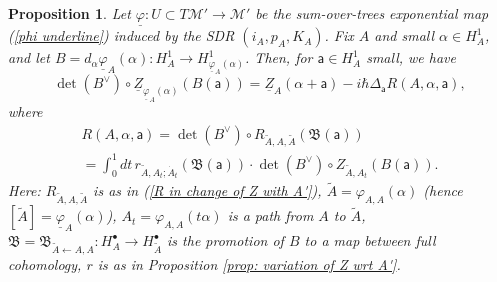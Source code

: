 \documentclass[11pt,a4paper]{amsart}
\theoremstyle{plain} %
\newtheorem{prop}[thm]{Proposition}
\theoremstyle{definition}
\theoremstyle{remark}
\newcommand{\sfa}{\mathsf{a}}
\newcommand{\sfb}{\mathsf{b}}
\newcommand{\bt}{\bullet}
\newcommand{\ra}{\rightarrow}
\newcommand{\M}{\mathcal{M}}
\newcommand{\til}{\widetilde}
\newcommand{\la}{\leftarrow}
\newcommand{\ul}{\underline}
\begin{document}
\begin{prop}\label{prop ulZ finite horizontality}
    Let $\underline\varphi \colon U \subset T\M'\to \M'$ be the sum-over-trees exponential map (\ref{phi underline}) induced by the SDR $(i_{A},p_{A},K_{A})$. Fix $A$ and small $\alpha\in H^1_{A}$, %
    and let $B=d_\alpha\ul\varphi_{A}(\alpha)\colon H^1_{A}\ra H^1_{\ul\varphi_A(\alpha)}$. Then, for $\sfa\in H^1_{A}$ small, we have
    \begin{equation}\label{Z underline finite almost-Grothendieck-horizontality}
        \det(B^\vee)\circ \underline{Z}_{\underline{\varphi}_{A}(\alpha)} (B(\sfa))=\underline{Z}_{A}(\alpha + \sfa)  -i\hbar \Delta_\sfa R(A,\alpha,\sfa) ,
    \end{equation}
    where 
    \begin{multline}\label{R for Z underline finite almost-Grothendieck-horizontality}
        R(A,\alpha,\sfa)=\det (B^\vee)\circ R_{\til{A},A,\til{A}}(\mathfrak{B}(\sfa))\\
        = \int_0^1 dt\, r_{\til{A},A_t;\dot{A}_t}(\mathfrak{B}(\sfa))\cdot \det(B^\vee)\circ Z_{\til{A},A_t}(B(\sfa)).
    \end{multline}
    Here: $R_{\til{A},A,\til{A}}$ %
    is as in (\ref{R in change of Z with A'}),
    $\til{A}=\varphi_{A,A}(\alpha)$ (hence $[\til{A}]=\ul\varphi_{A}(\alpha)$), $A_t=\varphi_{A,A}(t\alpha)$ is a path from $A$ to $\til{A}$,  $\mathfrak{B}=\mathfrak{B}_{\til{A}\la A,A}\colon H^\bt_A\ra H^\bt_{\til{A}}$ is the promotion of $B$ to a map between full cohomology, $r$ is as in Proposition \ref{prop: variation of Z wrt A'}.
\end{prop}
\end{document}

